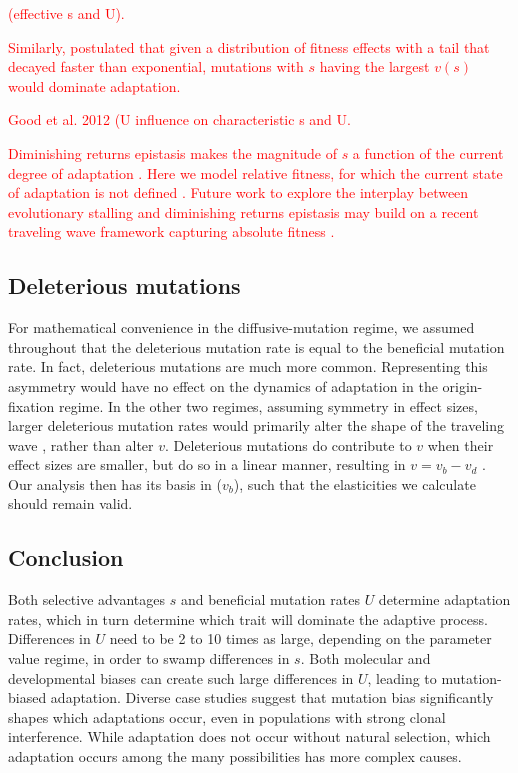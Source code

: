 \documentclass[9pt,twocolumn,twoside]{article}
\begin{document}
\textcolor{red}{\citet{Hegreness2006}(effective s and U).}

\textcolor{red}{Similarly, \citet{desai2007beneficial} postulated that given a distribution of fitness effects with a tail that decayed faster than exponential, mutations with $s$ having the largest $v(s)$ would dominate adaptation.}

\textcolor{red}{Good et al. 2012 (U influence on characteristic s and U. }

\textcolor{red}{Diminishing returns epistasis makes the magnitude of $s$ a function of the current degree of adaptation \citep{Couce2015a}. Here we model relative fitness, for which the current state of adaptation is not defined \citep{Good2015}. Future work to explore the interplay between evolutionary stalling and diminishing returns epistasis may build on a recent traveling wave framework capturing absolute fitness \cite{bertram2017predicting}.}

\subsection{Deleterious mutations}

For mathematical convenience in the diffusive-mutation regime, we assumed throughout that the deleterious mutation rate is equal to the beneficial mutation rate. In fact, deleterious mutations are much more common. Representing this asymmetry would have no effect on the dynamics of adaptation in the origin-fixation regime. In the other two regimes, assuming symmetry in effect sizes, larger deleterious mutation rates would primarily alter the shape of the traveling wave \citep{desai2007beneficial,fisher2013asexual,good2014deleterious}, rather than alter $v$. Deleterious mutations do contribute to $v$ when their effect sizes are smaller, but do so in a linear manner, resulting in $v=v_b-v_d$ \citep{good2014deleterious}. Our analysis then has its basis in ($v_b$), such that the elasticities we calculate should remain valid. 

\subsection{Conclusion} 
Both selective advantages $s$ and beneficial mutation rates $U$ determine adaptation rates, which in turn determine which trait will dominate the adaptive process. Differences in $U$ need to be 2 to 10 times as large, depending on the parameter value regime, in order to swamp differences in $s$. Both molecular and developmental biases can create such large differences in $U$, leading to mutation-biased adaptation. Diverse case studies suggest that mutation bias significantly shapes which adaptations occur, even in populations with strong clonal interference. While adaptation does not occur without natural selection, which adaptation occurs among the many possibilities has more complex causes.
\end{document}
